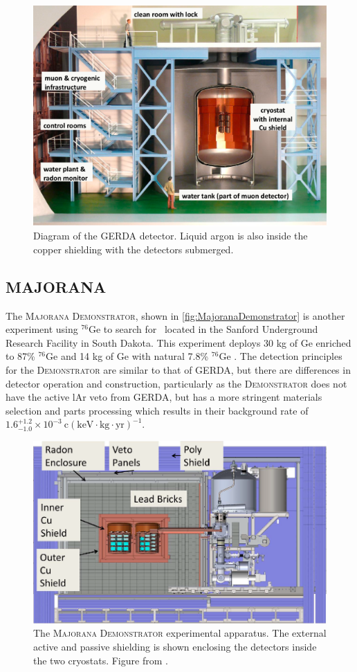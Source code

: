 \begin{figure}[tbph]
\centering
\includegraphics[width=0.7\linewidth]{Figures/gerda-view.png}
\caption{Diagram of the GERDA detector. Liquid argon is also inside the copper shielding with the detectors submerged.}
\label{fig:gerda-labelled}
\end{figure}

\subsection{MAJORANA}
The \textsc{Majorana Demonstrator}, shown in \autoref{fig:MajoranaDemonstrator} is another experiment using $^{76}$Ge to search for \zeronubb~located in the Sanford Underground Research Facility in South Dakota. This experiment deploys 30 kg of Ge enriched to 87\% $^{76}$Ge and 14 kg of Ge with natural 7.8\% $^{76}$Ge \cite{1742-6596-606-1-012004}. The detection principles for the \textsc{Demonstrator} are similar to that of GERDA, but there are differences in detector operation and construction, particularly as the \textsc{Demonstrator} does not have the active lAr veto from GERDA, but has a more stringent materials selection and parts processing which results in their background rate of $1.6^{+1.2}_{-1.0}\times10^{-3} ~\textrm{c}(\textrm{keV}\cdot \textrm{kg} \cdot \textrm{yr})^{-1}$.

\begin{figure}
    \centering
    \includegraphics[width=0.8\linewidth]{Figures/MajoranaDemonstrator.png}
    \caption[The \textsc{Majorana Demonstrator} experimental apparatus.]{The \textsc{Majorana Demonstrator} experimental apparatus. The external active and passive shielding is shown enclosing the detectors inside the two cryostats. Figure from \cite{1742-6596-606-1-012004}.}
    \label{fig:MajoranaDemonstrator}
\end{figure}

